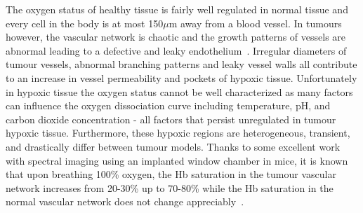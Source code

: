 The oxygen status of healthy tissue is fairly well regulated in normal tissue and every cell in the body is at most 150$\mu$m away from a blood vessel. 
In tumours however, the vascular network is chaotic and the growth patterns of vessels are abnormal leading to a defective and leaky endothelium~\cite{McDonald:2002ut}. 
Irregular diameters of tumour vessels, abnormal branching patterns and leaky vessel walls all contribute to an increase in vessel permeability and pockets of hypoxic tissue. 
Unfortunately in hypoxic tissue the oxygen status cannot be well characterized as many factors can influence the oxygen dissociation curve including temperature, pH, and carbon dioxide concentration - all factors that persist unregulated in tumour hypoxic tissue. 
Furthermore, these hypoxic regions are heterogeneous, transient, and drastically differ between tumour models. 
Thanks to some excellent work with spectral imaging using an implanted window chamber in mice, it is known that upon breathing 100\% oxygen, the \acs{Hb} saturation in the tumour vascular network increases from 20-30\% up to 70-80\% while the \acs{Hb} saturation in the normal vascular network does not change appreciably~\cite{Sorg:2008eg}.


